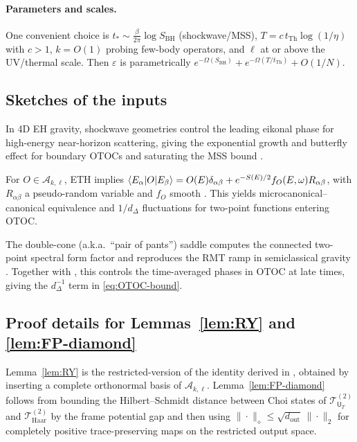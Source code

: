 \documentclass[a4paper,11pt]{article}
\let\mathscr\mathcal
\theoremstyle{plain}
\theoremstyle{definition}
\theoremstyle{remark}
\begin{document}
\paragraph{Parameters and scales.}  One convenient choice is $t_\ast\sim \frac{\beta}{2\pi}\log S_{\mathrm{BH}}$ (shockwave/MSS), $T=c\, t_{\mathrm{Th}} \log(1/\eta)$ with $c>1$, $k=O(1)$ probing few-body operators, and $\ell$ at or above the UV/thermal scale.  Then $\varepsilon$ is parametrically $e^{-\Omega(S_{\mathrm{BH}})} + e^{-\Omega(T/t_{\mathrm{Th}})} + O(1/N)$.

\subsection*{Sketches of the inputs}
 In 4D EH gravity, shockwave geometries control the leading eikonal phase for high-energy near-horizon scattering, giving the exponential growth and butterfly effect for boundary OTOCs and saturating the MSS bound \cite{MaldacenaShenkerStanford2016,ShenkerStanford2014}.

 For $O\in\mathscr{A}_{k,\ell}$, ETH implies
$\left\langle E_\alpha \middle| O \middle| E_\beta\right\rangle = O(E)\delta_{\alpha\beta} + e^{-S(E)/2} f_O(E,\omega) R_{\alpha\beta}$, with $R_{\alpha\beta}$ a pseudo-random variable and $f_O$ smooth \cite{DAlessioKafriPolkovnikovRigol2016}.  This yields microcanonical--canonical equivalence and $1/d_\Delta$ fluctuations for two-point functions entering $\mathrm{OTOC}$.

 The double-cone (a.k.a.\ ``pair of pants'') saddle computes the connected two-point spectral form factor and reproduces the RMT ramp in semiclassical gravity \cite{SaadShenkerStanford2019}.  Together with \cite{CotlerEtAl2017}, this controls the time-averaged phases in $\mathrm{OTOC}$ at late times, giving the $d_\Delta^{-1}$ term in \eqref{eq:OTOC-bound}.

\subsection*{Proof details for Lemmas~\ref{lem:RY} and \ref{lem:FP-diamond}}
Lemma~\ref{lem:RY} is the restricted-version of the identity derived in \cite{RobertsYoshida2017}, obtained by inserting a complete orthonormal basis of $\mathscr{A}_{k,\ell}$.  Lemma~\ref{lem:FP-diamond} follows from bounding the Hilbert--Schmidt distance between Choi states of $\mathcal{T}^{(2)}_{\mathsf{U}_T}$ and $\mathcal{T}^{(2)}_{\mathrm{Haar}}$ by the frame potential gap and then using $\|\cdot\|_\diamond \le \sqrt{d_{\mathrm{out}}}\,\|\cdot\|_2$ for completely positive trace-preserving maps on the restricted output space.
\end{document}

